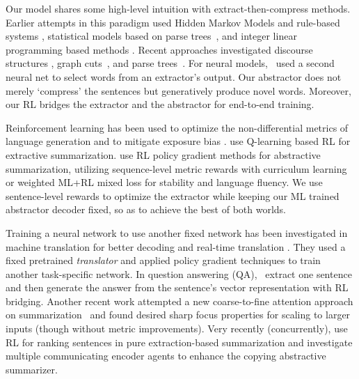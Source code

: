 \documentclass[11pt,a4paper]{article}
\begin{document}
Our model shares some high-level intuition with extract-then-compress methods.
Earlier attempts in this paradigm used Hidden Markov Models and rule-based systems \citep{Jing:2000:CPB:974305.974329},
statistical models based on parse trees~\citep{Knight:2000:SSS:647288.721086},
and integer linear programming based methods
\citep{Martins:2009:SJM:1611638.1611639,Gillick:2009:SGM:1611638.1611640,Clarke:Lapata:2010,Berg-Kirkpatrick:2011:JLE:2002472.2002534}.
Recent approaches investigated discourse structures
\citep{Louis:2010:DIC:1944506.1944533,hirao-EtAl:2013:EMNLP,kikuchi2014single,Wang:2015:SBT:2876444.2876454}, 
graph cuts~\citep{qian-liu:2013:EMNLP2}, 
and parse trees~\citep{D14-1076,conf/acl/BingLLLGP15}.
For neural models,~\citet{cheng-lapata:2016:P16-1} used a second neural net to select words from an extractor's output.
Our abstractor does not merely `compress' the sentences
but generatively produce novel words. 
Moreover, our RL bridges the extractor and the abstractor for end-to-end training.

Reinforcement learning has been used to optimize
the non-differential metrics of language generation and to mitigate exposure bias 
\citep{DBLP:journals/corr/RanzatoCAZ15,DBLP:journals/corr/BahdanauBXGLPCB16}. \citet{RL_TUD-CS-2015-0145} use Q-learning based RL for extractive summarization. \citet{DBLP:journals/corr/PaulusXS17} use RL policy gradient methods for abstractive summarization, utilizing sequence-level metric rewards with curriculum learning \citep{DBLP:journals/corr/RanzatoCAZ15} or weighted ML+RL mixed loss \citep{DBLP:journals/corr/PaulusXS17} for stability and language fluency.
We use sentence-level rewards to optimize the extractor while keeping our ML trained abstractor decoder fixed, so as to achieve the best of both worlds.


Training a neural network to use another fixed network has been investigated in machine translation
for better decoding \citep{DBLP:journals/corr/GuCL17} and real-time translation \citep{DBLP:journals/corr/GuNCL16}. 
They used a fixed pretrained \textit{translator} and applied policy gradient techniques to train another task-specific network.
In question answering (QA),~ extract one sentence and then generate the answer from the sentence's vector representation with RL bridging.
Another recent work attempted a new coarse-to-fine attention approach on summarization~\citep{C2F_Summ} and found desired sharp focus properties for scaling to larger inputs (though without metric improvements).
Very recently (concurrently), \citet{extract_rl} use RL for ranking sentences in pure extraction-based summarization and \citet{comm_agent} investigate multiple communicating encoder agents to enhance the copying abstractive summarizer.
\end{document}
